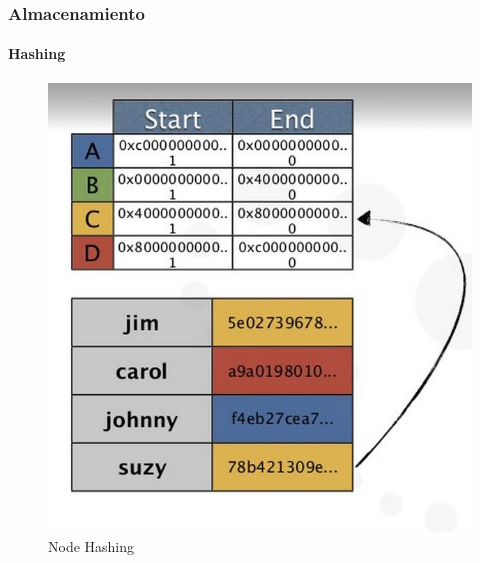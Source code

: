 \documentclass{beamer}
\begin{document}
\begin{frame}
  \frametitle{Almacenamiento}
  \framesubtitle{Hashing}
   \begin{figure}[h!]
      \centering        
      \includegraphics[scale=0.25]{hash.jpg}
      \caption{Node Hashing}
  \end{figure}

\end{frame}
\end{document}
